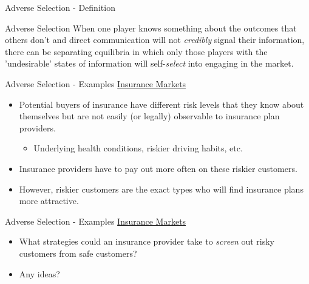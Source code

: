 
\begin{frame}{Adverse Selection - Definition}
  \begin{block}{Adverse Selection}
  When one player knows something about the outcomes that others don't 
  and direct communication will not \textit{credibly} signal their information,
  there can be separating equilibria in which only those players
  with the 'undesirable' states of information will 
  self-\textit{select} into engaging in the market.
  \end{block}
\end{frame}


\begin{frame}{Adverse Selection - Examples}
  \underline{\Large{Insurance Markets}}
  \begin{itemize}
    \item Potential buyers of insurance have different risk levels
    that they know about themselves but are not easily (or legally)
    observable to insurance plan providers.
    \begin{itemize}
      \item Underlying health conditions, riskier driving habits, etc.
    \end{itemize}
    \item Insurance providers have to pay out more often
    on these riskier customers.
    \item However, riskier customers are the exact types 
    who will find insurance plans more attractive.
  \end{itemize}
\end{frame}


\begin{frame}{Adverse Selection - Examples}
  \underline{\Large{Insurance Markets}}
  \begin{itemize}
    \item What strategies could an insurance provider take 
    to \textit{screen} out risky customers from safe customers?
    \item Any ideas?
  \end{itemize}
\end{frame}


